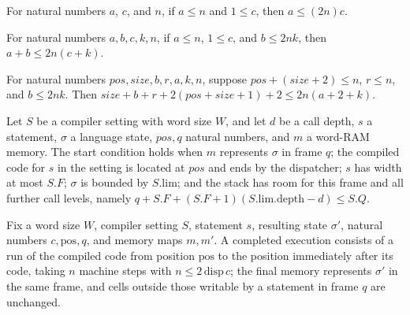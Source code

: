\begin{theorem}
\label{Light.Compiler.le_stepsPerStep_mul}
\leanok
{}
For natural numbers $a$, $c$, and $n$, if $a\le n$ and $1\le c$, then $a\le (2n)c$.
\end{theorem}

\begin{theorem}
\label{Light.Compiler.add_le_stepsPerStep_mul}
\leanok
{}
For natural numbers $a,b,c,k,n$, if $a\le n$, $1\le c$, and $b\le 2nk$, then $a+b\le
2n(c+k)$.
\end{theorem}

\begin{theorem}
\label{Light.Compiler.call_le_stepsPerStep_mul}
\leanok
{}
For natural numbers $pos,size,b,r,a,k,n$, suppose $pos+(size+2)\le n$, $r\le n$, and
$b\le 2nk$. Then $size+b+r+2(pos+size+1)+2\le 2n(a+2+k)$.
\end{theorem}

\begin{definition}
\label{Light.Compiler.Start}
\leanok
{}
Let $S$ be a compiler setting with word size $W$, and let $d$ be a call depth, $s$ a
statement, $\sigma$ a language state, $pos,q$ natural numbers, and $m$ a word-RAM memory.
The start condition holds when $m$ represents $\sigma$ in frame $q$; the compiled code
for $s$ in the setting is located at $pos$ and ends by the dispatcher; $s$ has width at
most $S.F$; $\sigma$ is bounded by $S.\mathrm{lim}$; and the stack has room for this frame
and all further call levels, namely
$q+S.F+(S.F+1)(S.\mathrm{lim.depth}-d)\le S.Q$.
\end{definition}

\begin{definition}
\label{Light.Compiler.Finished}
\leanok
{}
Fix a word size $W$, compiler setting $S$, statement $s$, resulting state $\sigma'$,
natural numbers $c,\mathrm{pos},q$, and memory maps $m,m'$. A completed execution
consists of a run of the compiled code from position $\mathrm{pos}$ to the position
immediately after its code, taking $n$ machine steps with $n\leq 2\,\mathrm{disp}\,c$;
the final memory represents $\sigma'$ in the same frame, and cells outside those
writable by a statement in frame $q$ are unchanged.
\end{definition}

